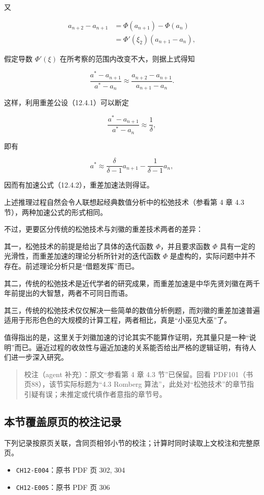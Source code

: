\documentclass[
  10pt,
  fontset=fandol]{ctexart}
\providecommand{\tightlist}{%
  \setlength{\itemsep}{0pt}\setlength{\parskip}{0pt}}
\begin{document}
又

\[
\begin{aligned}
a_{n+2}-a_{n+1}&=\Phi(a_{n+1})-\Phi(a_n)\\
&=\Phi'(\xi_2)(a_{n+1}-a_n),
\end{aligned}
\]

假定导数 \(\Phi'(\xi)\) 在所考察的范围内改变不大，则据上式得知

\[
\frac{a^*-a_{n+1}}{a^*-a_n}\approx\frac{a_{n+2}-a_{n+1}}{a_{n+1}-a_n}.
\]

这样，利用重差公设（12.4.1）可以断定

\[
\frac{a^*-a_{n+1}}{a^*-a_n}\approx\frac1\delta,
\]

即有

\[
a^*\approx\frac{\delta}{\delta-1}a_{n+1}-\frac1{\delta-1}a_n,
\]

因而有加速公式（12.4.2），重差加速法则得证。

上述推理过程自然会令人联想起经典数值分析中的松弛技术（参看第 4 章 4.3 节），两种加速公式的形式相同。

不过，更要区分传统的松弛技术与刘徽的重差技术两者的差异：

其一，松弛技术的前提是给出了具体的迭代函数 \(\Phi\)，并且要求函数 \(\Phi\) 具有一定的光滑性，而重差加速的理论分析所针对的迭代函数 \(\Phi\) 是虚构的，实际问题中并不存在。前述理论分析只是``借题发挥''而已。

其二，传统的松弛技术是近代学者的研究成果，而重差加速是中华先贤刘徽在两千年前提出的大智慧，两者不可同日而语。

其三，传统的松弛技术仅仅解决一些简单的数值分析例题，而刘徽的重差加速普遍适用于形形色色的大规模的计算工程，两者相比，真是``小巫见大巫''了。

值得指出的是，这里关于刘徽加速的讨论其实不能算作证明，充其量只是一种``说明''而已。逼近过程的收敛性与逼近加速的关系能否给出严格的逻辑证明，有待人们进一步深入研究。

\begin{quote}
校注（agent 补充）：原文``参看第 4 章 4.3 节''已保留。回看 PDF101（书页88），该节实际标题为``4.3 Romberg 算法''，此处对``松弛技术''的章节指引疑有误；未推定或代填作者意指的章节号。
\end{quote}

\subsection{本节覆盖原页的校注记录}\label{ux672cux8282ux8986ux76d6ux539fux9875ux7684ux6821ux6ce8ux8bb0ux5f55}

下列记录按原页关联，含同页相邻小节的校注；计算时同时读取上文校注和完整原页。

\begin{itemize}
\tightlist
\item
  \texttt{CH12-E004}：原书 PDF 页 302, 304
\item
  \texttt{CH12-E005}：原书 PDF 页 306
\end{itemize}
\end{document}
